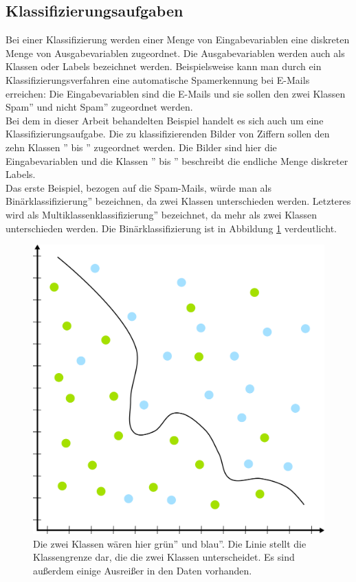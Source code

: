 \documentclass[11pt]{article}
\begin{document}
\subsection{Klassifizierungsaufgaben}
Bei einer Klassifizierung werden einer Menge von Eingabevariablen eine diskreten Menge von Ausgabevariablen zugeordnet. Die Ausgabevariablen werden auch als Klassen oder Labels bezeichnet werden. Beispielsweise kann man durch ein Klassifizierungsverfahren eine automatische Spamerkennung bei E-Mails erreichen: Die Eingabevariablen sind die E-Mails und sie sollen den zwei Klassen \glqq Spam'' und \glqq nicht Spam'' zugeordnet werden.\\
Bei dem in dieser Arbeit behandelten Beispiel handelt es sich auch um eine Klassifizierungsaufgabe. Die zu klassifizierenden Bilder von Ziffern sollen den zehn Klassen '' bis '' zugeordnet werden. Die Bilder sind hier die Eingabevariablen und die Klassen '' bis '' beschreibt die endliche Menge diskreter Labels.\\
Das erste Beispiel, bezogen auf die Spam-Mails, würde man als \glqq Binärklassifizierung'' bezeichnen, da zwei Klassen unterschieden werden. Letzteres wird als \glqq Multiklassenklassifizierung'' bezeichnet, da mehr als zwei Klassen unterschieden werden. Die Binärklassifizierung ist in Abbildung \ref{Classification} verdeutlicht.
\begin{figure}[h]
	\centering
	\includegraphics[width=0.5\linewidth]{../graphics/Classification.png}
	\caption{Die zwei Klassen wären hier \glqq grün'' und \glqq blau''. Die Linie stellt die Klassengrenze dar, die die zwei Klassen unterscheidet. Es sind außerdem einige Ausreißer in den Daten vorhanden. }
	\label{Classification}
\end{figure}
\end{document}
